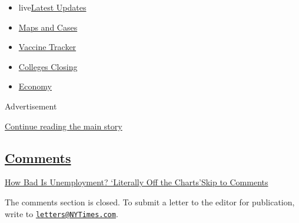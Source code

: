 \begin{itemize}
\tightlist
\item
  live\href{https://www.nytimes3xbfgragh.onion/2020/08/21/world/covid-19-coronavirus.html?name=styln-coronavirus-national\&region=TOP_BANNER\&variant=undefined\&block=storyline_menu_recirc\&action=click\&pgtype=Interactive\&impression_id=683aef61-e3b5-11ea-bab9-57fae4024651}{Latest
  Updates}
\item
  \href{https://www.nytimes3xbfgragh.onion/interactive/2020/us/coronavirus-us-cases.html?name=styln-coronavirus-national\&region=TOP_BANNER\&variant=undefined\&block=storyline_menu_recirc\&action=click\&pgtype=Interactive\&impression_id=683aef62-e3b5-11ea-bab9-57fae4024651}{Maps
  and Cases}
\item
  \href{https://www.nytimes3xbfgragh.onion/interactive/2020/science/coronavirus-vaccine-tracker.html?name=styln-coronavirus-national\&region=TOP_BANNER\&variant=undefined\&block=storyline_menu_recirc\&action=click\&pgtype=Interactive\&impression_id=683b1670-e3b5-11ea-bab9-57fae4024651}{Vaccine
  Tracker}
\item
  \href{https://www.nytimes3xbfgragh.onion/2020/08/19/us/colleges-closing-covid.html?name=styln-coronavirus-national\&region=TOP_BANNER\&variant=undefined\&block=storyline_menu_recirc\&action=click\&pgtype=Interactive\&impression_id=683b1671-e3b5-11ea-bab9-57fae4024651}{Colleges
  Closing}
\item
  \href{https://www.nytimes3xbfgragh.onion/live/2020/08/21/business/stock-market-today-coronavirus?name=styln-coronavirus-national\&region=TOP_BANNER\&variant=undefined\&block=storyline_menu_recirc\&action=click\&pgtype=Interactive\&impression_id=683b1672-e3b5-11ea-bab9-57fae4024651}{Economy}
\end{itemize}

Advertisement

\protect\hyperlink{after-top}{Continue reading the main story}

\hypertarget{comments}{%
\subsection{\texorpdfstring{\protect\hyperlink{commentsContainer}{Comments}}{Comments}}\label{comments}}

\href{}{How Bad Is Unemployment? `Literally Off the Charts'}\href{}{Skip
to Comments}

The comments section is closed. To submit a letter to the editor for
publication, write to
\href{mailto:letters@NYTimes.com}{\nolinkurl{letters@NYTimes.com}}.

